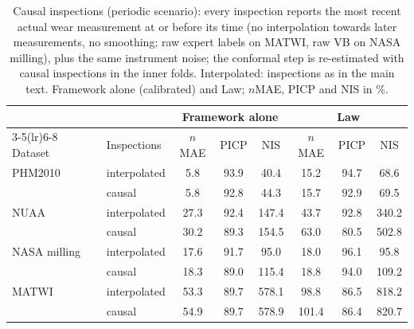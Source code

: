 \begin{table}[!htbp]
\centering
\caption{Causal inspections (periodic scenario): every inspection reports the most recent actual wear measurement at or before its time (no interpolation towards later measurements, no smoothing; raw expert labels on MATWI, raw VB on NASA milling), plus the same instrument noise; the conformal step is re-estimated with causal inspections in the inner folds. Interpolated: inspections as in the main text. Framework alone (calibrated) and Law; $n$MAE, PICP and NIS in \%.}
\label{tab:Scausal}
\footnotesize\setlength{\tabcolsep}{3pt}
\begin{tabular}{llcccccc}
\toprule
 & & \multicolumn{3}{c}{Framework alone} & \multicolumn{3}{c}{Law}\\
\cmidrule(lr){3-5}\cmidrule(lr){6-8}
Dataset & Inspections & $n$MAE & PICP & NIS & $n$MAE & PICP & NIS\\
\midrule
PHM2010 & interpolated & 5.8 & 93.9 & 40.4 & 15.2 & 94.7 & 68.6\\
 & causal & 5.8 & 92.8 & 44.3 & 15.7 & 92.9 & 69.5\\
NUAA & interpolated & 27.3 & 92.4 & 147.4 & 43.7 & 92.8 & 340.2\\
 & causal & 30.2 & 89.3 & 154.5 & 63.0 & 80.5 & 502.8\\
NASA milling & interpolated & 17.6 & 91.7 & 95.0 & 18.0 & 96.1 & 95.8\\
 & causal & 18.3 & 89.0 & 115.4 & 18.8 & 94.0 & 109.2\\
MATWI & interpolated & 53.3 & 89.7 & 578.1 & 98.8 & 86.5 & 818.2\\
 & causal & 54.9 & 89.7 & 578.9 & 101.4 & 86.4 & 820.7\\
\bottomrule
\end{tabular}
\end{table}
